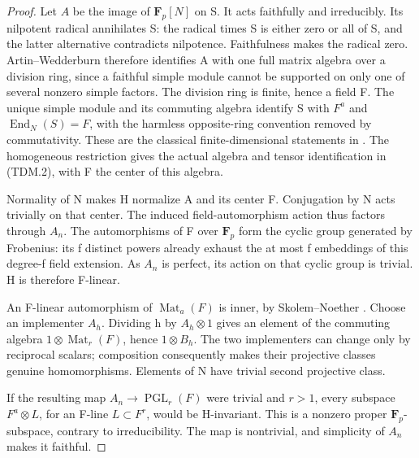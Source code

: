 \begin{proof}
Let \(A\) be the image of \(\mathbf F_p[N]\) on S.  It acts
faithfully and irreducibly.  Its nilpotent radical annihilates S:
the radical times S is either zero or all of S, and the latter
alternative contradicts nilpotence.  Faithfulness makes the radical
zero.  Artin--Wedderburn therefore identifies A with one full matrix
algebra over a division ring, since a faithful simple module cannot
be supported on only one of several nonzero simple factors.
The division ring is finite, hence a field F.  The unique simple
module and its commuting algebra identify S with \(F^a\) and
\(\operatorname{End}_N(S)=F\), with the harmless opposite-ring
convention removed by commutativity.  These are the classical
finite-dimensional statements in
\cite[ChapterII, Theorem2.2, pp.~83--84; Theorem2.13, pp.~91--92;
Theorem2.48, pp.~117--118]{TD:Knapp2016}.
The homogeneous restriction gives the actual algebra and tensor
identification in (TDM.2), with F the center of this algebra.

Normality of N makes H normalize A and its center F.  Conjugation
by N acts trivially on that center.  The induced field-automorphism
action thus factors through \(A_n\).  The automorphisms of F over
\(\mathbf F_p\) form the cyclic group generated by Frobenius:
its f distinct powers already exhaust the at most f embeddings of
this degree-f field extension.  As \(A_n\) is perfect, its action
on that cyclic group is trivial.  H is therefore F-linear.

An F-linear automorphism of \(\operatorname{Mat}_a(F)\) is inner,
by Skolem--Noether
\cite[Theorem2.41 and Corollary2.42, pp.~113--114]{TD:Knapp2016}.
Choose an implementer \(A_h\).  Dividing h by
\(A_h\otimes1\) gives an element of the commuting algebra
\(1\otimes\operatorname{Mat}_r(F)\), hence \(1\otimes B_h\).
The two implementers can change only by reciprocal scalars;
composition consequently makes their projective classes genuine
homomorphisms.  Elements of N have trivial second projective class.

If the resulting map \(A_n\to\operatorname{PGL}_r(F)\) were
trivial and \(r>1\), every subspace \(F^a\otimes L\), for an
F-line \(L\subset F^r\), would be H-invariant.  This is a
nonzero proper \(\mathbf F_p\)-subspace, contrary to irreducibility.
The map is nontrivial, and simplicity of \(A_n\) makes it faithful.


\end{proof}
